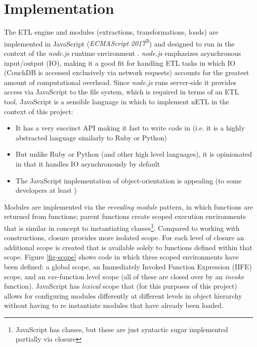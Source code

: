 \section{Implementation}
The ETL engine and modules (extractions, transformations, loads) are implemented in JavaScript (\textit{ECMAScript 2017\textsuperscript{®}}) \cite{ecmascript2017} and designed to run in the context of the \textit{node.js} runtime environment \cite{nodejs}. \textit{node.js} emphasizes asynchronous input/output (IO), making it a good fit for handling ETL tasks in which IO (CouchDB is accessed exclusively via network requests) accounts for the greatest amount of computational overhead. Since \textit{node.js} runs server-side it provides access via JavaScript to the file system, which is required in terms of an ETL tool. JavaScript is a sensible language in which to implement nETL in the context of this project:

\begin{itemize}
    \item It has a very succinct API making it fast to write code in (i.e. it is a highly abstracted language similarly to Ruby or Python)
    \item But unlike Ruby or Python (and other high level languages), it is opinionated in that it handles IO asynchronously by default
    \item The JavaScript implementation of object-orientation is appealing (to some developers at least \cite{jsBook})
\end{itemize}

Modules are implemented via the \textit{revealing module} pattern, in which functions are returned from functions; parent functions create scoped execution environments that is similar in concept to instantiating classes\footnote{JavaScript has classes, but these are just syntactic sugar implemented partially via closure}. Compared to working with constructions, closure provides more isolated scope. For each level of closure an additional scope is created that is available solely to functions defined within that scope. Figure \ref{fig-scope} shows code in which three scoped environments have been defined: a global scope, an Immediately Invoked Function Expression (IIFE) scope, and an \textit{exe}-function level scope (all of these are closed over by an \textit{invoke} function). JavaScript has \textit{lexical} scope \cite{jsBook2} that (for this purposes of this project) allows for configuring modules differently at different levels in object hierarchy without having to re instantiate modules that have already been loaded.

